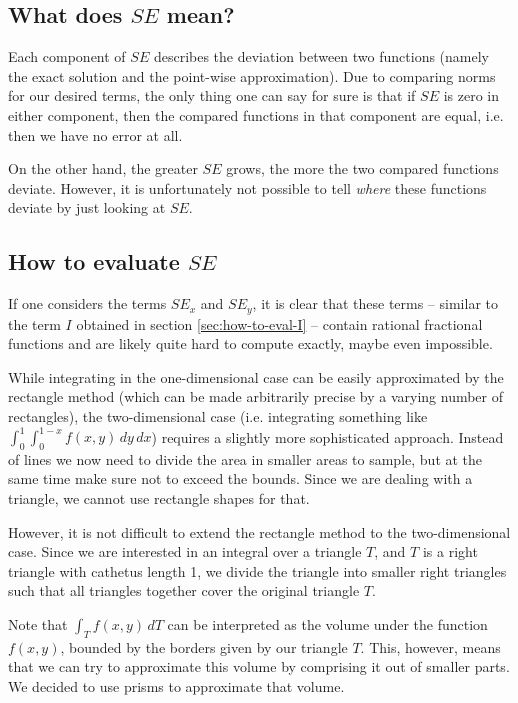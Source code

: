 \documentclass{article}
\begin{document}
\subsection{\texorpdfstring{What does $SE$ mean?}{What does SE mean?}}
\label{sec:stiffness-analysis-what-does-se-mean}

Each component of $SE$ describes the deviation between two functions (namely the exact solution and the point-wise approximation). Due to comparing norms for our desired terms, the only thing one can say for sure is that if $SE$ is zero in either component, then the compared functions in that component are equal, i.e. then we have no error at all.

On the other hand, the greater $SE$ grows, the more the two compared functions deviate. However, it is unfortunately not possible to tell \emph{where} these functions deviate by just looking at $SE$.

\subsection{\texorpdfstring{How to evaluate $SE$}{How to evaluate SE}}
\label{sec:how-to-evaluate-e}

If one considers the terms $SE_x$ and $SE_y$, it is clear that these terms -- similar to the term $I$ obtained in section \ref{sec:how-to-eval-I} -- contain rational fractional functions and are likely quite hard to compute exactly, maybe even impossible.

While integrating in the one-dimensional case can be easily approximated by the rectangle method (which can be made arbitrarily precise by a varying number of rectangles), the two-dimensional case (i.e. integrating something like $\int_{0}^1 \int_0^{1-x} f(x,y)\, dy\, dx$) requires a slightly more sophisticated approach. Instead of lines we now need to divide the area in smaller areas to sample, but at the same time make sure not to exceed the bounds. Since we are dealing with a triangle, we cannot use rectangle shapes for that.

However, it is not difficult to extend the rectangle method to the two-dimensional case. Since we are interested in an integral over a triangle $T$, and $T$ is a right triangle with cathetus length 1, we divide the triangle into smaller right triangles such that all triangles together cover the original triangle $T$.

Note that $\int_T f(x,y)\,dT$ can be interpreted as the volume under the function $f(x,y)$, bounded by the borders given by our triangle $T$. This, however, means that we can try to approximate this volume by comprising it out of smaller parts. We decided to use prisms to approximate that volume.
\end{document}
